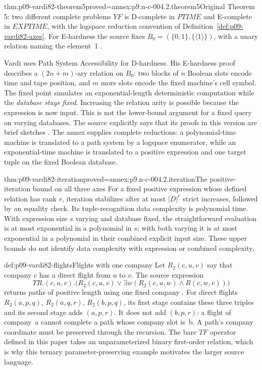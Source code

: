 \begin{hbtheorem}{thm:p09-vardi82-theorem5}{proved=annex:p9.n-c-004.2.theorem5}{Original Theorem 5: two different complete problems}
\(YF\) is D-complete in \(PTIME\) and E-complete in \(EXPTIME\),
with the logspace reduction convention of
Definition~\ref{def:p09-vardi82-axes}.  For E-hardness the source fixes
\(B_0=(\{0,1\},\{\langle1\rangle\})\), with a unary relation naming
the element~1 \cite[Theorem~5, pp.~141--142]{Vardi1982}.
\end{hbtheorem}

Vardi uses Path System Accessibility for D-hardness. His E-hardness proof
describes a \((2n+m)\)-ary relation on \(B_0\): two blocks of
\(n\) Boolean slots encode time and tape position, and \(m\) more slots
encode the fixed machine's cell symbol.  The fixed point simulates an
exponential-length deterministic computation while the \emph{database stays
fixed}.  Increasing the relation arity is possible because the expression is
now input.  This is not the lower-bound argument for a fixed query on varying
databases.  The source explicitly says that its proofs in this version are
brief sketches \cite[pp.~138, 141--142]{Vardi1982}. The annex supplies
complete reductions: a polynomial-time machine is translated to a path
system by a logspace enumerator, while an exponential-time machine is
translated to a positive expression and one target tuple on the fixed
Boolean database.

\begin{hblemma}{thm:p09-vardi82-iteration}{proved=annex:p9.n-c-004.2.iteration}{The positive-iteration bound on all three axes}
For a fixed positive expression whose defined relation has rank \(r\),
iteration stabilizes after at most \(\lvert D\rvert^r\) strict increases,
followed by an equality check.  Its tuple-recognition data complexity is
polynomial time.  With expression size \(s\) varying and database fixed,
the straightforward evaluation is at most exponential in a polynomial in
\(s\); with both varying it is at most exponential in a polynomial in
their combined explicit input size.  These upper bounds do not identify data
complexity with expression or combined complexity.
\end{hblemma}

\begin{hbexample}{def:p09-vardi82-flights}{Flights with one company}
Let \(R_2(c,u,v)\) say that company \(c\) has a direct flight from
\(u\) to \(v\).  The source expression
\[
 \Upsilon R.(c,u,v).
   \bigl(R_2(c,u,v)\lor
          \exists w(R_2(c,u,w)\land R(c,w,v))\bigr)
\]
returns paths of positive length using one fixed company
\cite[p.~140]{Vardi1982}.  For direct flights
\(R_2(a,p,q)\), \(R_2(a,q,r)\), \(R_2(b,p,q)\), its first stage
contains these three triples and its second stage adds \((a,p,r)\).
It does not add \((b,p,r)\): a flight of company~a cannot complete a
path whose company slot is~b.  A path's company coordinate must be preserved
through the recursion.  The bare \(TF\) operator defined in this paper takes
an unparameterized binary first-order relation, which is why this ternary
parameter-preserving example motivates the larger source language.
\end{hbexample}

